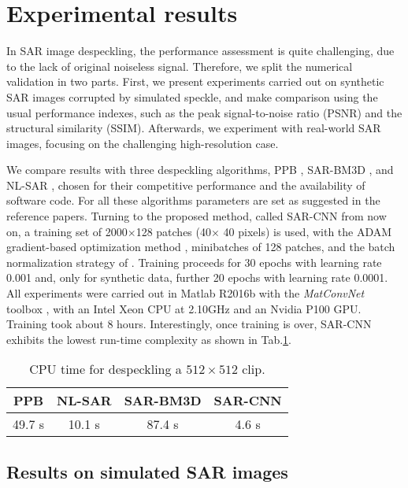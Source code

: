 \documentclass{article}
\begin{document}
\section{Experimental results}\label{sec:experiments}

In SAR image despeckling, the performance assessment is quite challenging,
due to the lack of original noiseless signal.
Therefore, we split the numerical validation in two parts.
First, we present experiments carried out on synthetic SAR images corrupted by simulated speckle,
and make comparison using the usual performance indexes,
such as the peak signal-to-noise ratio (PSNR) and the structural similarity (SSIM).
Afterwards, we experiment with real-world SAR images, focusing on the challenging high-resolution case.

We compare results with three despeckling algorithms, PPB \cite{Deledalle2009}, SAR-BM3D \cite{Parrilli2012}, and NL-SAR \cite{Deledalle2015},
chosen for their competitive performance and the availability of software code.
For all these algorithms parameters are set as suggested in the reference papers.
Turning to the proposed method, called SAR-CNN from now on,
a training set of 2000$\times$128 patches (40$\times$ 40 pixels) is used, with the ADAM gradient-based optimization method \cite{Kingma2015}, minibatches of 128 patches, and the batch normalization strategy of \cite{Ioffe2015}.
Training proceeds for 30 epochs with learning rate 0.001 and, only for synthetic data, further 20 epochs with learning rate 0.0001.
All experiments were carried out in Matlab R2016b with the \emph{MatConvNet} toolbox \cite{Vedaldi2015}, with an Intel Xeon CPU at 2.10GHz and an Nvidia P100 GPU.
Training took about 8 hours.
Interestingly, once training is over, SAR-CNN exhibits the lowest run-time complexity as shown in Tab.\ref{tab:times}.

\begin{table}
	\centering
	\caption{CPU time for despeckling a $512\times512$ clip.}
	\label{tab:times}
	\small
	\begin{tabular}{cccc}
		\toprule
		PPB & NL-SAR & SAR-BM3D & SAR-CNN \\
		\midrule
		49.7 s & 10.1 s & 87.4 s & 4.6 s \\
		\bottomrule
	\end{tabular}
\end{table}

\subsection{Results on simulated SAR images}
\end{document}
